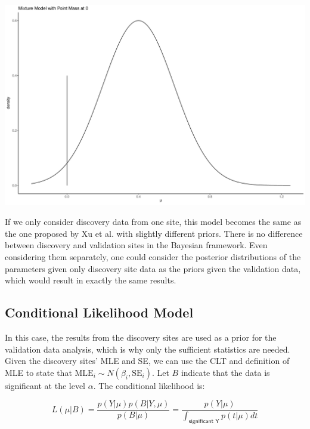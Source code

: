 \documentclass[AMA,STIX1COL]{WileyNJD-v2}\usepackage[]{graphicx}\usepackage[]{color}
\newenvironment{knitrout}{}{} %
\begin{document}
\begin{knitrout}
\color{fgcolor}

{\centering \includegraphics[width=6in]{figure/mixture-1} 

}



\end{knitrout}


If we only consider discovery data from one site, this model becomes the same as the one proposed by Xu et al.\cite{xu2011bayesian} with slightly different priors. There is no difference between discovery and validation sites in the Bayesian framework. Even considering them separately, one could consider the posterior distributions of the parameters given only discovery site data as the priors given the validation data, which would result in exactly the same results. 

\subsection{Conditional Likelihood Model}

In this case, the results from the discovery sites are used as a prior for the validation data analysis, which is why only the sufficient statistics are needed. Given the discovery sites' MLE and SE, we can use the CLT and definition of MLE to state that $\text{MLE}_i \sim N(\beta_i, \text{SE}_i)$. Let $B$ indicate that the data is significant at the level $\alpha$. The conditional likelihood is:

\begin{equation}\label{eq4}
L(\mu | B) = \frac{p(Y| \mu)p(B| Y,\mu)}{p(B|\mu)} =  \frac{p(Y| \mu)}{\int_{\textsf{significant Y}} p(t| \mu) dt }
\end{equation}
\end{document}
